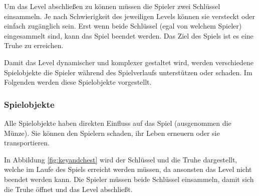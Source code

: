 Um das Level abschließen zu können müssen die Spieler zwei Schlüssel einsammeln. Je nach Schwierigkeit des jeweiligen Levels können sie versteckt oder einfach zugänglich sein. Erst wenn beide Schlüssel (egal von welchem Spieler) eingesammelt sind, kann das Spiel beendet werden. Das Ziel des Spiels ist es eine Truhe zu erreichen. 

Damit das Level dynamischer und komplexer gestaltet wird, werden verschiedene Spielobjekte die Spieler während des Spielverlaufs unterstützen oder schaden. Im Folgenden werden diese Spielobjekte vorgestellt.

\subsubsection{Spielobjekte}
\label{subsubsec:implementierung:umsetzung:realisierung:spielobjekte}
Alle Spielobjekte haben direkten Einfluss auf das Spiel (ausgenommen die Münze). Sie können den Spielern schaden, ihr Leben erneuern oder sie transportieren. 

In Abbildung \ref{fig:keyandchest} wird der Schlüssel und die Truhe dargestellt, welche im Laufe des Spiels erreicht werden müssen, da ansonsten das Level nicht beendet werden kann. Die Spieler müssen beide Schlüssel einsammeln, damit sich die Truhe öffnet und das Level abschließt.

